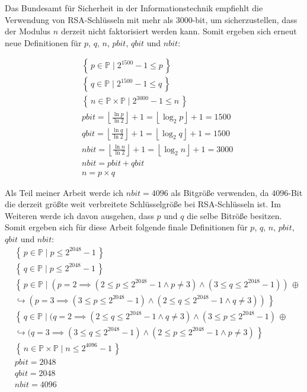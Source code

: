 Das Bundesamt für Sicherheit in der Informationstechnik empfiehlt die Verwendung von RSA-Schlüsseln mit mehr als 3000-bit, um sicherzustellen, dass der Modulus $n$ derzeit nicht faktorisiert werden kann.\cite{bsicrypto} Somit ergeben sich erneut neue Definitionen für $p$, $q$, $n$, $pbit$, $qbit$ und $nbit$:

\begin{equation}
  \begin{split}
    &\left\{\,p \in \mathbb{P}\mid 2^{1500}-1 \le p\, \right\}\\
    &\left\{\,q \in \mathbb{P}\mid 2^{1500}-1 \le q\, \right\}\\
    &\left\{\,n \in \mathbb{P} \times \mathbb{P}\mid 2^{3000}-1 \le n\, \right\}\\
    &pbit=\left\lfloor\frac{\ln{p}}{\ln{2}}\right\rfloor+1=\left\lfloor\log_2{p}\right\rfloor+1=1500\\
    &qbit=\left\lfloor\frac{\ln{q}}{\ln{2}}\right\rfloor+1=\left\lfloor\log_2{q}\right\rfloor+1=1500\\
    &nbit=\left\lfloor\frac{\ln{n}}{\ln{2}}\right\rfloor+1=\left\lfloor\log_2{n}\right\rfloor+1=3000\\
    &nbit=pbit+qbit\\
    &n=p \times q
  \end{split}
\end{equation}
\newpage

Als Teil meiner Arbeit werde ich $nbit=4096$ als Bitgröße verwenden, da $4096$-Bit die derzeit größte weit verbreitete Schlüsselgröße bei RSA-Schlüsseln ist. Im Weiteren werde ich davon ausgehen, dass $p$ und $q$ die selbe Bitröße besitzen. Somit ergeben sich für diese Arbeit folgende finale Definitionen für $p$, $q$, $n$, $pbit$, $qbit$ und $nbit$:
\begin{equation}
  \begin{split}
    &\left\{\,p \in \mathbb{P}\mid p \le 2^{2048}-1\, \right\}\\
    &\left\{\,q \in \mathbb{P}\mid p \le 2^{2048}-1\, \right\}\\
    &\left\{\,p \in \mathbb{P}\mid (p=2 \implies (2 \le p \le 2^{2048}-1 \land p \ne 3) \land (3 \le q \le 2^{2048}-1))\, \oplus \right. \\ &\hookrightarrow \left. (p=3 \implies (3 \le p \le 2^{2048}-1) \land (2 \le q \le 2^{2048}-1 \land q \ne 3))\, \right\}\\
    &\left\{\,q \in \mathbb{P}\mid (q=2 \implies (2 \le q \le 2^{2048}-1 \land q \ne 3) \land (3 \le p \le 2^{2048}-1)\, \oplus \right. \\ &\hookrightarrow \left. (q=3 \implies (3 \le q \le 2^{2048}-1) \land (2 \le p \le 2^{2048}-1 \land p \ne 3)\, \right\}\\
    &\left\{\,n \in \mathbb{P} \times \mathbb{P}\mid n \le 2^{4096}-1\, \right\}\\
    &pbit=2048\\
    &qbit=2048\\
    &nbit=4096\\
  \end{split}
\end{equation}
